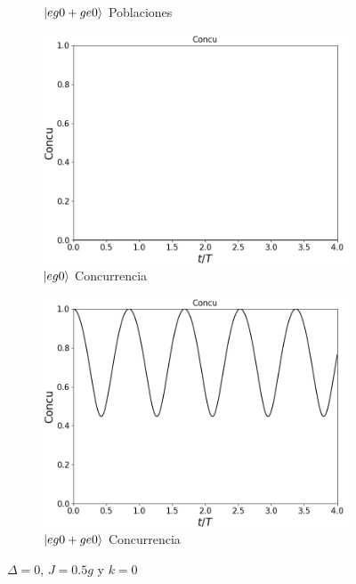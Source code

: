 \begin{figure}[H]
\begin{subfigure}{0.49\textwidth}
        \caption{$\ket{eg0+ge0}$ Poblaciones}
        \label{fig4:pob j eg0 sim}
    \end{subfigure}
    \vfill
    \begin{subfigure}{0.49\textwidth}
        \includegraphics[width=\textwidth]{figuras/ch4/j eg0 concu.png}
        \caption{$\ket{eg0}$ Concurrencia}
        \label{fig4:pob j eg0}
    \end{subfigure}
    \hfill
    \begin{subfigure}{0.49\textwidth}
        \includegraphics[width=\textwidth]{figuras/ch4/j eg0+ge0 concu.png}
        \caption{$\ket{eg0+ge0}$ Concurrencia}
        \label{fig4:pob j eg0 sim}
    \end{subfigure}
    \caption{$\Delta=0$, $J=0.5g$ y $k=0$}
    \label{fig4:j alpha0}
\end{figure}
